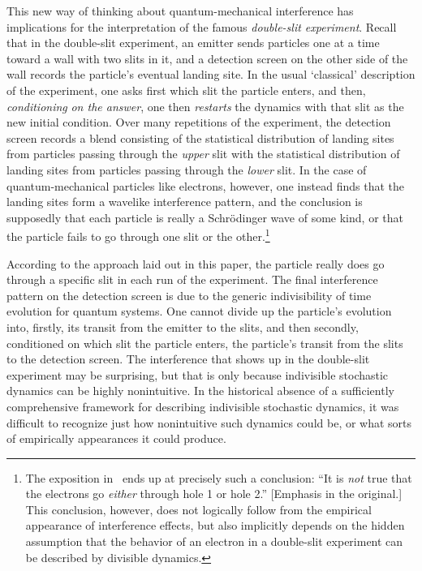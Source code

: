 \documentclass[12pt,english,prl,superscriptaddress,nobibnotes,nofootinbib]{revtex4-2}
\begin{document}
This new way of thinking about quantum-mechanical interference has
implications for the interpretation of the famous \emph{double-slit experiment}.
Recall that in the double-slit experiment, an emitter sends particles
one at a time toward a wall with two slits in it, and a detection
screen on the other side of the wall records the particle's eventual
landing site. In the usual \textquoteleft classical\textquoteright{}
description of the experiment, one asks first which slit the particle
enters, and then, \emph{conditioning} \emph{on the answer}, one then
\emph{restarts} the dynamics with that slit as the new initial condition.
Over many repetitions of the experiment, the detection screen records
a blend consisting of the statistical distribution of landing sites
from particles passing through the \emph{upper} slit with the statistical
distribution of landing sites from particles passing through the \emph{lower}
slit. In the case of quantum-mechanical particles like electrons,
however, one instead finds that the landing sites form a wavelike
interference pattern, and the conclusion is supposedly that each particle
is really a Schr{\" o}dinger wave of some kind, or that the particle fails
to go through one slit or the other.\footnote{The exposition in~\citep{FeynmanLeightonSands:1965tflopv3} ends
up at precisely such a conclusion: ``It is \emph{not} true that the
electrons go \emph{either} through hole 1 or hole 2.'' {[}Emphasis
in the original.{]} This conclusion, however, does not logically follow
from the empirical appearance of interference effects, but also implicitly
depends on the hidden assumption that the behavior of an electron
in a double-slit experiment can be described by divisible dynamics.}

According to the approach laid out in this paper, the particle really
does go through a specific slit in each run of the experiment. The
final interference pattern on the detection screen is due to the generic
indivisibility of time evolution for quantum systems. One cannot divide
up the particle's evolution into, firstly, its transit from the emitter
to the slits, and then secondly, conditioned on which slit the particle
enters, the particle's transit from the slits to the detection screen.
The interference that shows up in the double-slit experiment may be
surprising, but that is only because indivisible stochastic dynamics
can be highly nonintuitive. In the historical absence of a sufficiently
comprehensive framework for describing indivisible stochastic dynamics,
it was difficult to recognize just how nonintuitive such dynamics
could be, or what sorts of empirically appearances it could produce.
\end{document}
